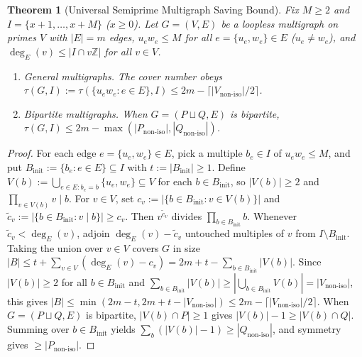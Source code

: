 \documentclass[11pt]{article}
\newtheorem{theorem}{Theorem}
\theoremstyle{remark}
\begin{document}
\begin{theorem}[Universal Semiprime Multigraph Saving Bound]
\label{thm:multigraph}
Fix $M \ge 2$ and $I = \{x + 1, \dots, x + M\}$ ($x \ge 0$). Let $G = (V, E)$ be a loopless multigraph on primes $V$ with $|E| = m$ edges, $u_e w_e \le M$ for all $e = \{u_e, w_e\} \in E$ ($u_e \neq w_e$), and $\deg_E(v) \le |I \cap v \mathbb{Z}|$ for all $v \in V$.
\begin{enumerate}
\item \emph{General multigraphs.} The cover number obeys $\tau(G, I) := \tau(\{u_e w_e : e \in E\}, I) \le 2 m - \lceil |V_{\mathrm{non\text{-}iso}}| / 2 \rceil$.
\item \emph{Bipartite multigraphs.} When $G = (P \sqcup Q, E)$ is bipartite, $\tau(G, I) \le 2 m - \max(|P_{\mathrm{non\text{-}iso}}|, |Q_{\mathrm{non\text{-}iso}}|)$.
\end{enumerate}
\end{theorem}
\begin{proof}
For each edge $e = \{u_e, w_e\} \in E$, pick a multiple $b_e \in I$ of $u_e w_e \le M$, and put $B_{\mathrm{init}} := \{b_e : e \in E\} \subseteq I$ with $t := |B_{\mathrm{init}}| \ge 1$. Define $V(b) := \bigcup_{e \in E : b_e = b} \{u_e, w_e\} \subseteq V$ for each $b \in B_{\mathrm{init}}$, so $|V(b)| \ge 2$ and $\prod_{v \in V(b)} v \mid b$. For $v \in V$, set $c_v := |\{b \in B_{\mathrm{init}} : v \in V(b)\}|$ and $\tilde{c}_v := |\{b \in B_{\mathrm{init}} : v \mid b\}| \ge c_v$. Then $v^{\tilde{c}_v}$ divides $\prod_{b \in B_{\mathrm{init}}} b$. Whenever $\tilde{c}_v < \deg_E(v)$, adjoin $\deg_E(v) - \tilde{c}_v$ untouched multiples of $v$ from $I \setminus B_{\mathrm{init}}$. Taking the union over $v \in V$ covers $G$ in size $|B| \le t + \sum_{v \in V} (\deg_E(v) - c_v) = 2 m + t - \sum_{b \in B_{\mathrm{init}}} |V(b)|$. Since $|V(b)| \ge 2$ for all $b \in B_{\mathrm{init}}$ and $\sum_{b \in B_{\mathrm{init}}} |V(b)| \ge |\bigcup_{b \in B_{\mathrm{init}}} V(b)| = |V_{\mathrm{non\text{-}iso}}|$, this gives $|B| \le \min(2 m - t, 2 m + t - |V_{\mathrm{non\text{-}iso}}|) \le 2 m - \lceil |V_{\mathrm{non\text{-}iso}}| / 2 \rceil$. When $G = (P \sqcup Q, E)$ is bipartite, $|V(b) \cap P| \ge 1$ gives $|V(b)| - 1 \ge |V(b) \cap Q|$. Summing over $b \in B_{\mathrm{init}}$ yields $\sum_b (|V(b)| - 1) \ge |Q_{\mathrm{non\text{-}iso}}|$, and symmetry gives $\ge |P_{\mathrm{non\text{-}iso}}|$.
\end{proof}
\end{document}
